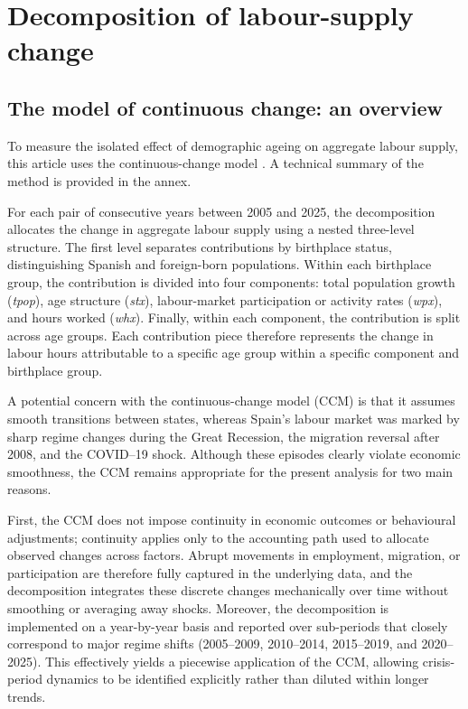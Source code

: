 \section{Decomposition of labour-supply change}

\subsection{The model of continuous change: an overview}

To measure the isolated effect of demographic ageing on aggregate labour supply, this article uses the continuous-change model \citep{horiuchiDecompositionMethodBased2008}. A technical summary of the method is provided in the annex.

\vspace{0.7em}\par
For each pair of consecutive years between 2005 and 2025, the decomposition allocates the change in aggregate labour supply using a nested three-level structure. The first level separates contributions by birthplace status, distinguishing Spanish and foreign-born populations. Within each birthplace group, the contribution is divided into four components: total population growth (\textit{tpop}), age structure (\textit{stx}), labour-market participation or activity rates (\textit{wpx}), and hours worked (\textit{whx}). Finally, within each component, the contribution is split across age groups. Each contribution piece therefore represents the change in labour hours attributable to a specific age group within a specific component and birthplace group.


\vspace{0.7em}\par
A potential concern with the continuous-change model (CCM) is that it assumes smooth transitions between states, whereas Spain’s labour market was marked by sharp regime changes during the Great Recession, the migration reversal after 2008, and the COVID--19 shock. Although these episodes clearly violate economic smoothness, the CCM remains appropriate for the present analysis for two main reasons.

\vspace{0.7em}\par
First, the CCM does not impose continuity in economic outcomes or behavioural adjustments; continuity applies only to the accounting path used to allocate observed changes across factors. Abrupt movements in employment, migration, or participation are therefore fully captured in the underlying data, and the decomposition integrates these discrete changes mechanically over time without smoothing or averaging away shocks. Moreover, the decomposition is implemented on a year-by-year basis and reported over sub-periods that closely correspond to major regime shifts (2005--2009, 2010--2014, 2015--2019, and 2020--2025). This effectively yields a piecewise application of the CCM, allowing crisis-period dynamics to be identified explicitly rather than diluted within longer trends.

